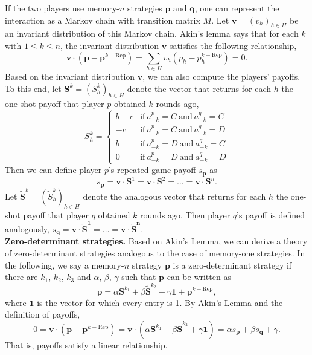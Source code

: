 \documentclass{article}
\theoremstyle{definition}
\begin{document}
If the two players use memory-$n$ strategies $\mathbf{p}$ and $\mathbf{q}$, one can represent the interaction as a Markov chain with transition matrix $M$. 
Let $\mathbf{v}=(v_h)_{h\in H}$ be an invariant distribution of this Markov chain. 
Akin's lemma says that for each $k$ with $1\!\le\!k\!\le\!n$, the invariant distribution $\mathbf{v}$ satisfies the following relationship,
\begin{equation} \label{Eq:AkinsLemma}
\mathbf{v} \cdot (\mathbf{p}-\mathbf{p}^{k-\text{Rep}}) \!=\! \sum_{h\in H} v_h (p_h-p_h^{k-\text{Rep}}) = 0.
\end{equation}
Based on the invariant distribution $\mathbf{v}$, we can also compute the players' payoffs. To this end, let $\mathbf{S}^k = (S_h^k)_{h\in H}$ denote the vector that returns for each $h$ the one-shot payoff that player $p$ obtained $k$ rounds ago, 
\begin{equation}
S_h^k = \left\{
\begin{array}{cl}
b-c	&\text{if}~ a_{-k}^p=C~\text{and}~ a_{-k}^q=C\\
-c	&\text{if}~ a_{-k}^p=C~\text{and}~ a_{-k}^q=D\\
b	&\text{if}~ a_{-k}^p=D~\text{and}~ a_{-k}^q=C\\
0	&\text{if}~ a_{-k}^p=D~\text{and}~ a_{-k}^q=D
\end{array}
\right.
\end{equation}
Then we can define player $p$'s repeated-game payoff $s_\mathbf{p}$ as 
\begin{equation} \label{Eq:Payoff}
s_\mathbf{p} = \mathbf{v}\cdot \mathbf{S}^1 = \mathbf{v}\cdot \mathbf{S}^2 = \ldots = \mathbf{v} \cdot \mathbf{S}^n.
\end{equation}
Let $\mathbf{\tilde{S}}^k=(\tilde{S}_h^k)_{h\in H}$ denote the analogous vector that returns for each $h$ the one-shot payoff that player $q$ obtained $k$ rounds ago. 
Then player $q$'s payoff is defined analogously, $s_\mathbf{q} = \mathbf{v} \cdot \mathbf{\tilde{S}^1} = \ldots = \mathbf{v} \cdot \mathbf{\tilde{S}^n}$.\\

\noindent
{\bf Zero-determinant strategies.}
Based on Akin's Lemma, we can derive a theory of zero-determinant strategies analogous to the case of memory-one strategies. 
In the following, we say a memory-$n$ strategy $\mathbf{p}$ is a zero-determinant strategy if there are $k_1$, $k_2$, $k_3$ and $\alpha$, $\beta$, $\gamma$ such that $\mathbf{p}$ can be written as
\begin{equation} \label{Eq:DefZD}
\mathbf{p} = \alpha \mathbf{S}^{k_1} + \beta \mathbf{\tilde{S}}^{k_2} + \gamma \mathbf{1} + \mathbf{p}^{k-\text{Rep}},  
\end{equation} 
where $\mathbf{1}$ is the vector for which every entry is 1. By Akin's Lemma and the definition of payoffs,
\begin{equation} \label{Eq:PayoffZD}
0 = \mathbf{v} \cdot  (\mathbf{p} - \mathbf{p}^{k-\text{Rep}}) = \mathbf{v} \cdot (\alpha \mathbf{S}^{k_1} + \beta \mathbf{\tilde{S}}^{k_2} + \gamma \mathbf{1} ) = \alpha s_\mathbf{p} + \beta s_\mathbf{q} + \gamma. 
\end{equation}
That is, payoffs satisfy a linear relationship. 
\end{document}
